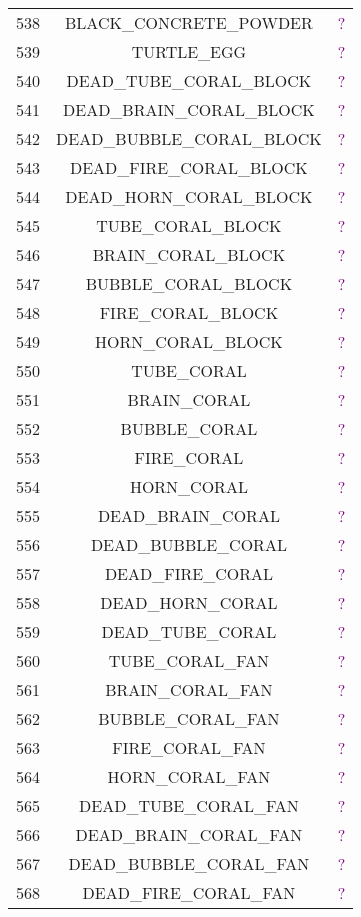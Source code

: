 \documentclass[11pt]{article}
\newcommand\myworries[1]{\textcolor{purple}{#1}}
\begin{document}
\begin{longtable}{ |c|c|c| }
	538 & BLACK\_CONCRETE\_POWDER & \myworries{?} \\
	539 & TURTLE\_EGG & \myworries{?} \\
	540 & DEAD\_TUBE\_CORAL\_BLOCK & \myworries{?} \\
	541 & DEAD\_BRAIN\_CORAL\_BLOCK & \myworries{?} \\
	542 & DEAD\_BUBBLE\_CORAL\_BLOCK & \myworries{?} \\
	543 & DEAD\_FIRE\_CORAL\_BLOCK & \myworries{?} \\
	544 & DEAD\_HORN\_CORAL\_BLOCK & \myworries{?} \\
	545 & TUBE\_CORAL\_BLOCK & \myworries{?} \\
	546 & BRAIN\_CORAL\_BLOCK & \myworries{?} \\
	547 & BUBBLE\_CORAL\_BLOCK & \myworries{?} \\
	548 & FIRE\_CORAL\_BLOCK & \myworries{?} \\
	549 & HORN\_CORAL\_BLOCK & \myworries{?} \\
	550 & TUBE\_CORAL & \myworries{?} \\
	551 & BRAIN\_CORAL & \myworries{?} \\
	552 & BUBBLE\_CORAL & \myworries{?} \\
	553 & FIRE\_CORAL & \myworries{?} \\
	554 & HORN\_CORAL & \myworries{?} \\
	555 & DEAD\_BRAIN\_CORAL & \myworries{?} \\
	556 & DEAD\_BUBBLE\_CORAL & \myworries{?} \\
	557 & DEAD\_FIRE\_CORAL & \myworries{?} \\
	558 & DEAD\_HORN\_CORAL & \myworries{?} \\
	559 & DEAD\_TUBE\_CORAL & \myworries{?} \\
	560 & TUBE\_CORAL\_FAN & \myworries{?} \\
	561 & BRAIN\_CORAL\_FAN & \myworries{?} \\
	562 & BUBBLE\_CORAL\_FAN & \myworries{?} \\
	563 & FIRE\_CORAL\_FAN & \myworries{?} \\
	564 & HORN\_CORAL\_FAN & \myworries{?} \\
	565 & DEAD\_TUBE\_CORAL\_FAN & \myworries{?} \\
	566 & DEAD\_BRAIN\_CORAL\_FAN & \myworries{?} \\
	567 & DEAD\_BUBBLE\_CORAL\_FAN & \myworries{?} \\
	568 & DEAD\_FIRE\_CORAL\_FAN & \myworries{?} \\

\end{longtable}
\end{document}
